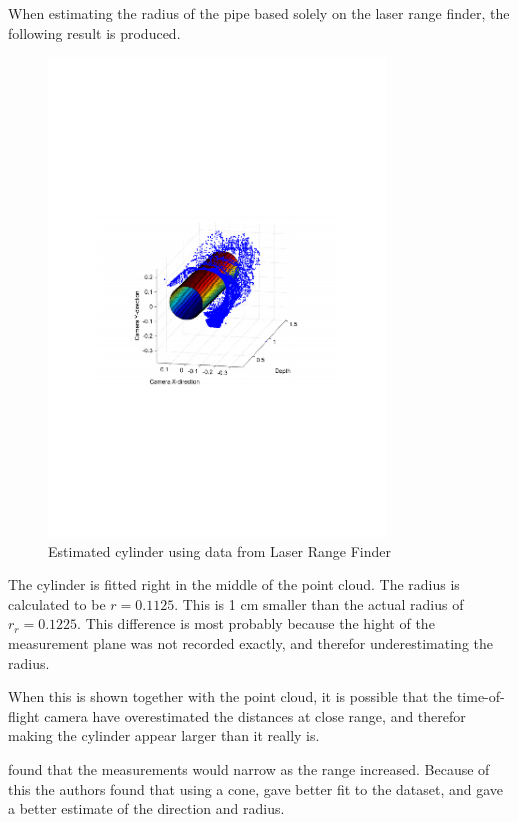 When estimating the radius of the pipe based solely on the laser range finder, the
following result is produced. 
\begin{figure}[htbp]
    \centering
    \includegraphics[width=0.8\textwidth]{pics/longpipe-urg-3d}
    \caption{Estimated cylinder using data from Laser Range Finder}
    \label{chap8:fig-longpipe-urg-3d}
\end{figure}
The cylinder is fitted right in the middle of the point cloud. The radius is calculated to be $r = 0.1125$. This
is 1 cm smaller than the actual radius of $r_r = 0.1225$. This difference is most
probably because the hight of the measurement plane was not recorded exactly, and therefor
underestimating the radius. 

When this is shown together with the point cloud, it is
possible that the time-of-flight camera have overestimated the distances at close range,
and therefor making the cylinder appear larger than it really is. 

\cite{sintef-tof} found
that the measurements would narrow as the range increased. Because of this the authors
found that using a cone, gave better fit to the dataset, and gave a better
estimate of the direction and radius. 


